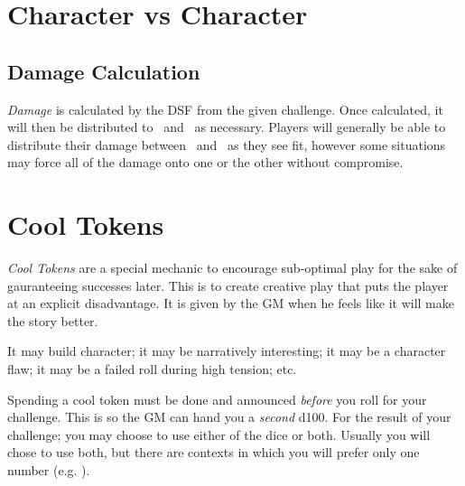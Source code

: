 
\section{Character vs Character}\label{sec:vs_character}
\subsection{Damage Calculation}\label{subsec:damage_calc}

\emph{Damage} is calculated by the DSF from
the given challenge. Once calculated, it will then be distributed
to \HPful\ and \ENful\ as necessary. Players will generally be able
to distribute their damage between \HPful\ and \ENful\ as they see
fit, however some situations may force all of the damage onto one
or the other without compromise. 

\section{Cool Tokens}\label{sec:cool_tokens}

\emph{Cool Tokens} are a special mechanic to encourage sub-optimal play for
the sake of gauranteeing successes later. This is to create creative
play that puts the player at an explicit disadvantage. It is given
by the GM when he feels like it will make the story better.

It may build character; it may be narratively interesting; it may be a character flaw; it may be a failed roll during high tension; etc.

Spending a cool token must be done and announced \emph{before} you
roll for your challenge. This is so the GM can hand you a \emph{second}
d100. For the result of your challenge; you may choose to use either
of the dice or both. Usually you will chose to use both, but there are contexts in which you will prefer only one number (e.g. \FORE ).

